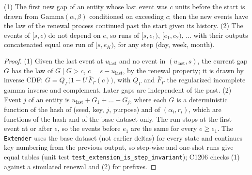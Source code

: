 \begin{proposition}\label{prop:tsincr}
(1) The first new gap of an entity whose last event was $c$ units before the start is drawn from
$\mathrm{Gamma}(\alpha,\beta)$ conditioned on exceeding $c$; then the new events have the law of the renewal process
continued past the start given its history. (2) The events of $[s,e)$ do not depend on $e$, so runs of $[s,e_1)$,
$[e_1,e_2)$, $\dots$ with their outputs concatenated equal one run of $[s,e_K)$, for any step (day, week, month).
\end{proposition}
\begin{proof}
(1) Given the last event at $u_{\mathrm{last}}$ and no event in $(u_{\mathrm{last}},s)$, the current gap $G$ has the
law of $G\mid G>c$, $c=s-u_{\mathrm{last}}$, by the renewal property; it is drawn by inverse CDF:
$G=Q_\Gamma\big(1-U\,\bar F_\Gamma(c)\big)$, with $Q_\Gamma$ and $\bar F_\Gamma$ the regularized incomplete gamma
inverse and complement. Later gaps are independent of the past. (2) Event $j$ of an entity is
$u_{\mathrm{last}}+G_1+\dots+G_j$, where each $G$ is a deterministic function of the hash of
(seed, key, $j$, purpose) and of $(\alpha_i,r_i)$, which are functions of the hash and of the base dataset only. The
run stops at the first event at or after $e$, so the events before $e_1$ are the same for every $e\ge e_1$. The
\texttt{Extender} uses the base dataset (not earlier deltas) for every state and continues key numbering from the
previous output, so step-wise and one-shot runs give equal tables (unit test
\texttt{test\_extension\_is\_step\_invariant}); C1206 checks (1) against a simulated renewal and (2) for prefixes.
\end{proof}
\setcounter{proposition}{\value{savedpropts}}

